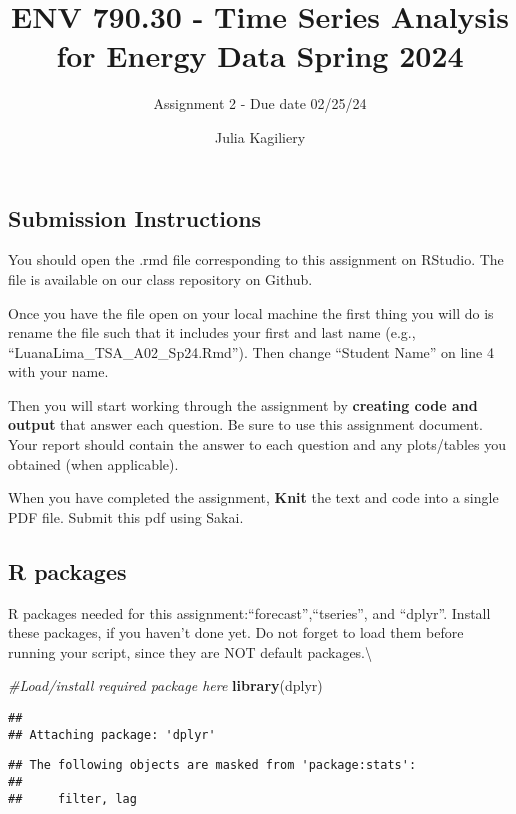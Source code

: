 \documentclass[
]{article}
\title{ENV 790.30 - Time Series Analysis for Energy Data \textbar{}
Spring 2024}
\subtitle{Assignment 2 - Due date 02/25/24}
\author{Julia Kagiliery}
\date{}
\newenvironment{Shaded}{\begin{snugshade}}{\end{snugshade}}
\newcommand{\CommentTok}[1]{\textcolor[rgb]{0.56,0.35,0.01}{\textit{#1}}}
\newcommand{\FunctionTok}[1]{\textcolor[rgb]{0.13,0.29,0.53}{\textbf{#1}}}
\newcommand{\NormalTok}[1]{#1}
\begin{document}
\maketitle

\hypertarget{submission-instructions}{%
\subsection{Submission Instructions}\label{submission-instructions}}

You should open the .rmd file corresponding to this assignment on
RStudio. The file is available on our class repository on Github.

Once you have the file open on your local machine the first thing you
will do is rename the file such that it includes your first and last
name (e.g., ``LuanaLima\_TSA\_A02\_Sp24.Rmd''). Then change ``Student
Name'' on line 4 with your name.

Then you will start working through the assignment by \textbf{creating
code and output} that answer each question. Be sure to use this
assignment document. Your report should contain the answer to each
question and any plots/tables you obtained (when applicable).

When you have completed the assignment, \textbf{Knit} the text and code
into a single PDF file. Submit this pdf using Sakai.

\hypertarget{r-packages}{%
\subsection{R packages}\label{r-packages}}

R packages needed for this assignment:``forecast'',``tseries'', and
``dplyr''. Install these packages, if you haven't done yet. Do not
forget to load them before running your script, since they are NOT
default packages.\textbackslash{}

\begin{Shaded}
\begin{Highlighting}[]
\CommentTok{\#Load/install required package here}
\FunctionTok{library}\NormalTok{(dplyr)}
\end{Highlighting}
\end{Shaded}

\begin{verbatim}
## 
## Attaching package: 'dplyr'
\end{verbatim}

\begin{verbatim}
## The following objects are masked from 'package:stats':
## 
##     filter, lag
\end{verbatim}
\end{document}
